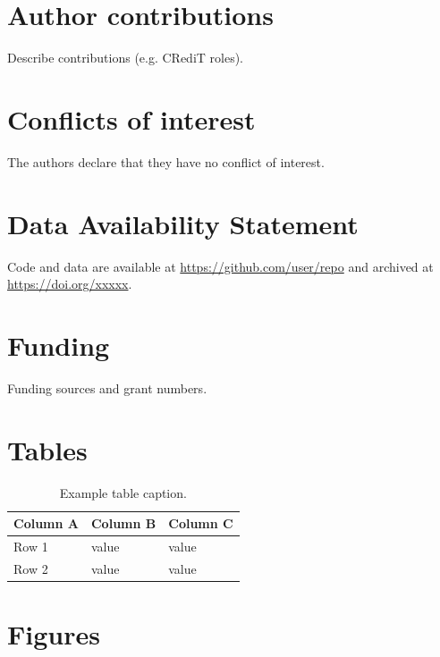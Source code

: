 \begin{spacing}{2}
\section{Author contributions}
Describe contributions (e.g. CRediT roles).

\section{Conflicts of interest}
The authors declare that they have no conflict of interest.

\section{Data Availability Statement}
Code and data are available at \url{https://github.com/user/repo} and archived
at \url{https://doi.org/xxxxx}.

\section{Funding}
Funding sources and grant numbers.



\end{spacing}
\clearpage

\section{Tables}

\begin{table}[htp]
  \centering
  \caption{Example table caption.}
  \renewcommand\arraystretch{2}
  \label{tab:example}
  \begin{tabular}{L{3cm} L{3cm} L{3cm}}
    \toprule
    \textbf{Column A} & \textbf{Column B} & \textbf{Column C} \\
    \midrule
    Row 1 & value & value \\
    Row 2 & value & value \\
    \bottomrule
  \end{tabular}
\end{table}
\clearpage

\section{Figures}

